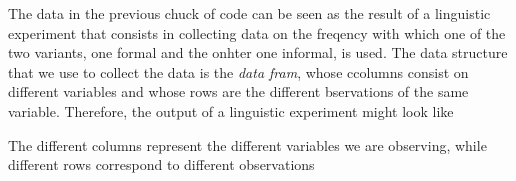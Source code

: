 	The  data in the previous chuck of code can be seen as the result of a linguistic experiment that consists in collecting data on the freqency with which one of the two variants, one formal and the onhter one informal, is used.  The data structure that we use to collect the data is the \emph{data fram}, whose ccolumns consist on different variables and whose rows are the different bservations of the same variable. Therefore, the  output of a linguistic experiment might look like 
\begin{knitrout}
\color{fgcolor}\begin{kframe}
\begin{alltt}
 \hlkwb{=} \hldef{( ))}
 \hlkwb{<-}  \hldef{(}         
\end{alltt}


{\ttfamily\noindent\bfseries{}}\begin{alltt}
\end{alltt}


{\ttfamily\noindent\bfseries\color{errorcolor}{\#\# Error in head(Experiment\_result): oggetto 'Experiment\_result' non trovato}}\end{kframe}
\end{knitrout}
The different columns represent the different variables  we are observing, while different rows correspond to different observations
	


